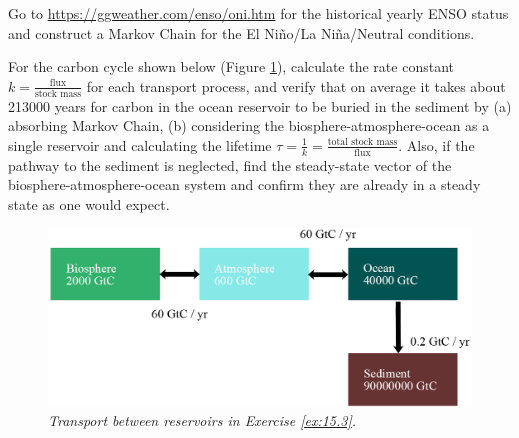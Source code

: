 \begin{Exercise}
Go to \href{https://ggweather.com/enso/oni.htm}{https://ggweather.com/enso/oni.htm} for the historical yearly ENSO status and construct a Markov Chain for the El Niño/La Niña/Neutral conditions.
\end{Exercise}

\begin{Exercise}
\label{ex:15.3}
For the carbon cycle shown below (Figure \ref{fig:ex15.3}), calculate the rate constant $k = \frac{\text{flux}}{\text{stock mass}}$ for each transport process, and verify that on average it takes about 213000 years for carbon in the ocean reservoir to be buried in the sediment by (a) absorbing Markov Chain, (b) considering the biosphere-atmosphere-ocean as a single reservoir and calculating the lifetime $\tau = \frac{1}{k} = \frac{\text{total stock mass}}{\text{flux}}$. Also, if the pathway to the sediment is neglected, find the steady-state vector of the biosphere-atmosphere-ocean system and confirm they are already in a steady state as one would expect.
\begin{figure}[ht!]
    \centering
    \includegraphics[scale = 1.1]{graphics/carboncycle.png}
    \caption{\textit{Transport between reservoirs in Exercise \ref{ex:15.3}.}}
    \label{fig:ex15.3}
\end{figure}
\end{Exercise}
